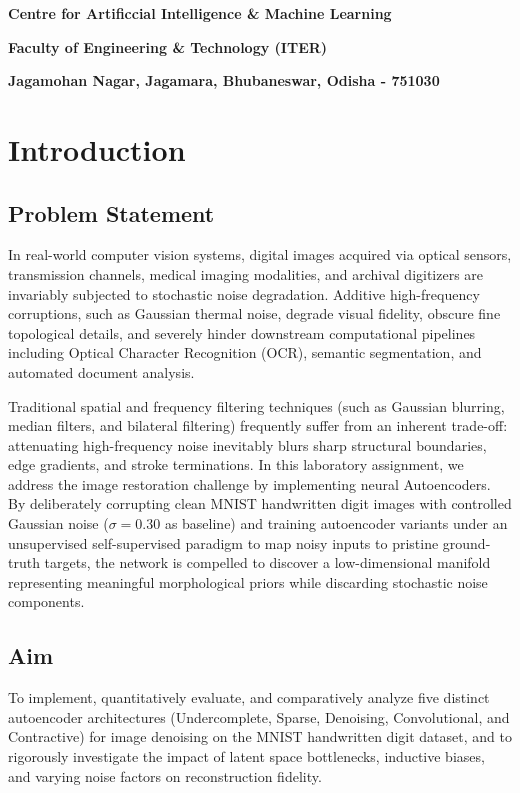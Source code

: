 \documentclass[12pt, a4paper]{article}
\begin{document}
\begin{titlepage}
    {\Large \textbf{Centre for Artificcial Intelligence \& Machine Learning} \par}
    \vspace{0.3cm}
    {\Large \textbf{Faculty of Engineering \& Technology (ITER)} \par}
    \vspace{0.3cm}
    {\large \textbf{Jagamohan Nagar, Jagamara, Bhubaneswar, Odisha - 751030} \par}
\end{titlepage}

\newpage

\section{Introduction}

\subsection{Problem Statement}
In real-world computer vision systems, digital images acquired via optical sensors, transmission channels, medical imaging modalities, and archival digitizers are invariably subjected to stochastic noise degradation. Additive high-frequency corruptions, such as Gaussian thermal noise, degrade visual fidelity, obscure fine topological details, and severely hinder downstream computational pipelines including Optical Character Recognition (OCR), semantic segmentation, and automated document analysis.

Traditional spatial and frequency filtering techniques (such as Gaussian blurring, median filters, and bilateral filtering) frequently suffer from an inherent trade-off: attenuating high-frequency noise inevitably blurs sharp structural boundaries, edge gradients, and stroke terminations. In this laboratory assignment, we address the image restoration challenge by implementing neural Autoencoders. By deliberately corrupting clean MNIST handwritten digit images with controlled Gaussian noise ($\sigma = 0.30$ as baseline) and training autoencoder variants under an unsupervised self-supervised paradigm to map noisy inputs to pristine ground-truth targets, the network is compelled to discover a low-dimensional manifold representing meaningful morphological priors while discarding stochastic noise components.

\subsection{Aim}
To implement, quantitatively evaluate, and comparatively analyze five distinct autoencoder architectures (Undercomplete, Sparse, Denoising, Convolutional, and Contractive) for image denoising on the MNIST handwritten digit dataset, and to rigorously investigate the impact of latent space bottlenecks, inductive biases, and varying noise factors on reconstruction fidelity.
\end{document}
